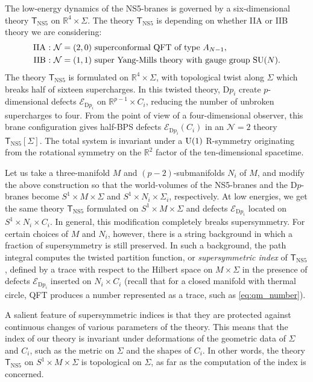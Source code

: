 The low-energy dynamics of the NS5-branes is governed by a six-dimensional
theory $\mathsf{T}_{\mathrm{NS5}}$ on $\mathbb{R}^{4}\times\Sigma$.
The theory $\mathsf{T}_{\mathrm{NS5}}$ is depending on whether IIA
or IIB theory we are considering:
\begin{align*}
  \textrm{IIA : }  &  \mathcal{N} = (2,0)  \text{ superconformal QFT of type } A_{N-1},  \\
  \textrm{IIB : }  &  \mathcal{N} = (1,1)  \text{ super Yang-Mills theory with gauge group } \mathrm{SU}(N).
\end{align*}
The theory $\mathsf{T}_{\mathrm{NS5}}$ is formulated on $\mathbb{R}^{4}\times\Sigma$,
with topological twist along $\Sigma$ which breaks half of sixteen
supercharges. In this twisted theory, D$p_{i}$ create $p$-dimensional
defects $\mathcal{E}_{\mathrm{D}p_{i}}$ on $\mathbb{R}^{p-1}\times C_{i}$,
reducing the number of unbroken supercharges to four. From the point
of view of a four-dimensional observer, this brane configuration gives
half-BPS defects $\mathcal{E}_{\mathrm{D}p_{i}}(C_{i})$
in an $\mathcal{N}=2$ theory $\mathsf{T}_{\mathrm{NS5}}[\Sigma]$.
The total system is invariant under a $\mathrm{U}(1)$ R-symmetry originating
from the rotational symmetry on the $\mathbb{R}^{2}$ factor of the
ten-dimensional spacetime.

Let us take a three-manifold $M$ and $(p-2)$-submanifolds $N_{i}$
of $M$, and modify the above construction so that the world-volumes
of the NS5-branes and the D$p$-branes become $S^{1}\times M\times\Sigma$
and $S^{1}\times N_{i}\times\Sigma_{i}$, respectively. At low energies,
we get the same theory $\mathsf{T}_{\mathrm{NS5}}$ formulated on
$S^{1}\times M\times\Sigma$ and defects $\mathcal{E}_{\mathrm{D}p_{i}}$
located on $S^{1}\times N_{i}\times C_{i}$. In general, this modification
completely breaks supersymmetry. For certain choices of $M$ and $N_{i}$,
however, there is a string background in which a fraction of supersymmetry
is still preserved. In such a background, the path integral computes
the twisted partition function, or \emph{supersymmetric index} of $\mathsf{T}_{\mathrm{NS5}}$,
defined by a trace with respect to the Hilbert space on $M\times\Sigma$ in the presence
of defects $\mathcal{E}_{\mathrm{D}p_{i}}$ inserted on $N_{i}\times C_{i}$
(recall that for a closed manifold with thermal circle, QFT produces a number represented as a trace,
such as \eqref{eq:qm_number}).

A salient feature of supersymmetric indices is that they are protected
against continuous changes of various parameters of the theory. This
means that the index of our theory is invariant under deformations
of the geometric data of $\Sigma$ and $C_{i}$, such as the metric
on $\Sigma$ and the shapes of $C_{i}$. In other words, the theory
$\mathsf{T}_{\mathrm{NS5}}$ on $S^{1}\times M\times\Sigma$ is topological
on $\Sigma$, as far as the computation of the index is concerned.

